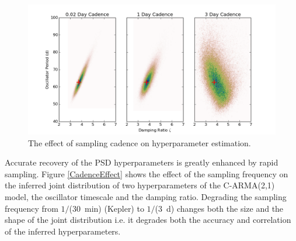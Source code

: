 \begin{figure}
\includegraphics[width=5.0in]{figs/agn/AGN_Variability_00.png}
\caption{The effect of sampling cadence on hyperparameter estimation.}
\label{CadenceEffec}
\end{figure}

Accurate recovery of the PSD hyperparameters is greatly enhanced by rapid sampling. Figure \ref{CadenceEffect}
shows the effect of the sampling frequency on the inferred joint distribution of two
 hyperparameters of the C-ARMA(2,1) model, the 
oscillator timescale and the damping ratio. Degrading the sampling frequency from $1/$($30$~min) 
(Kepler) to $1/$($3$~d) changes both the size and the shape of the joint distribution i.e. it degrades both 
the accuracy and correlation of the inferred hyperparameters. 



